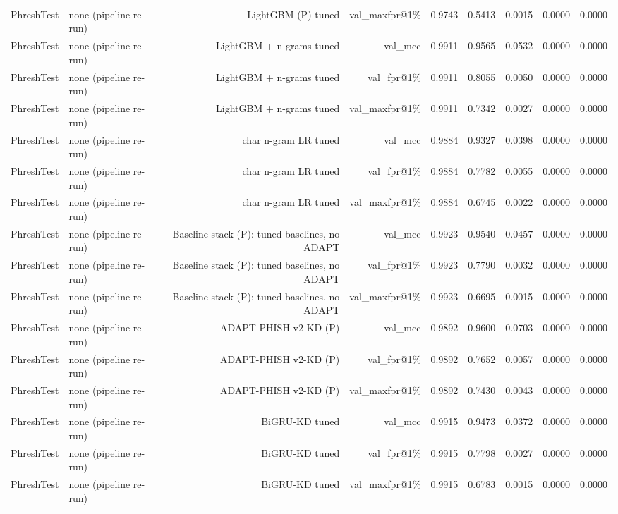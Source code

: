 \begin{table}[t]
\begin{tabular}{llrrrrrrr}
PhreshTest & none (pipeline re-run) & LightGBM (P) tuned & val\_maxfpr@1\% & 0.9743 & 0.5413 & 0.0015 & 0.0000 & 0.0000 \\
PhreshTest & none (pipeline re-run) & LightGBM + n-grams tuned & val\_mcc & 0.9911 & 0.9565 & 0.0532 & 0.0000 & 0.0000 \\
PhreshTest & none (pipeline re-run) & LightGBM + n-grams tuned & val\_fpr@1\% & 0.9911 & 0.8055 & 0.0050 & 0.0000 & 0.0000 \\
PhreshTest & none (pipeline re-run) & LightGBM + n-grams tuned & val\_maxfpr@1\% & 0.9911 & 0.7342 & 0.0027 & 0.0000 & 0.0000 \\
PhreshTest & none (pipeline re-run) & char n-gram LR tuned & val\_mcc & 0.9884 & 0.9327 & 0.0398 & 0.0000 & 0.0000 \\
PhreshTest & none (pipeline re-run) & char n-gram LR tuned & val\_fpr@1\% & 0.9884 & 0.7782 & 0.0055 & 0.0000 & 0.0000 \\
PhreshTest & none (pipeline re-run) & char n-gram LR tuned & val\_maxfpr@1\% & 0.9884 & 0.6745 & 0.0022 & 0.0000 & 0.0000 \\
PhreshTest & none (pipeline re-run) & Baseline stack (P): tuned baselines, no ADAPT & val\_mcc & 0.9923 & 0.9540 & 0.0457 & 0.0000 & 0.0000 \\
PhreshTest & none (pipeline re-run) & Baseline stack (P): tuned baselines, no ADAPT & val\_fpr@1\% & 0.9923 & 0.7790 & 0.0032 & 0.0000 & 0.0000 \\
PhreshTest & none (pipeline re-run) & Baseline stack (P): tuned baselines, no ADAPT & val\_maxfpr@1\% & 0.9923 & 0.6695 & 0.0015 & 0.0000 & 0.0000 \\
PhreshTest & none (pipeline re-run) & ADAPT-PHISH v2-KD (P) & val\_mcc & 0.9892 & 0.9600 & 0.0703 & 0.0000 & 0.0000 \\
PhreshTest & none (pipeline re-run) & ADAPT-PHISH v2-KD (P) & val\_fpr@1\% & 0.9892 & 0.7652 & 0.0057 & 0.0000 & 0.0000 \\
PhreshTest & none (pipeline re-run) & ADAPT-PHISH v2-KD (P) & val\_maxfpr@1\% & 0.9892 & 0.7430 & 0.0043 & 0.0000 & 0.0000 \\
PhreshTest & none (pipeline re-run) & BiGRU-KD tuned & val\_mcc & 0.9915 & 0.9473 & 0.0372 & 0.0000 & 0.0000 \\
PhreshTest & none (pipeline re-run) & BiGRU-KD tuned & val\_fpr@1\% & 0.9915 & 0.7798 & 0.0027 & 0.0000 & 0.0000 \\
PhreshTest & none (pipeline re-run) & BiGRU-KD tuned & val\_maxfpr@1\% & 0.9915 & 0.6783 & 0.0015 & 0.0000 & 0.0000 \\

\end{tabular}
\end{table}
